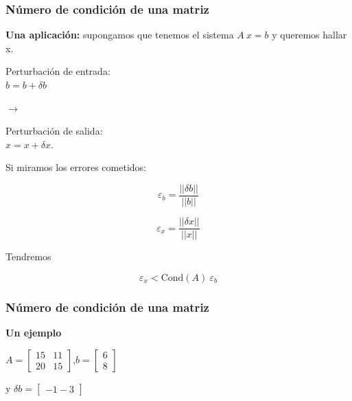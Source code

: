 \documentclass[xcolor=svgnames]{beamer} %
\theoremstyle{plain}
\renewcommand{\textbf}[1]{{\bfseries\textcolor{redUnq2}{#1}}}
\theoremstyle{definition}
\begin{document}
\begin{frame}
\frametitle{Número de condición de una matriz}\vspace{-15pt}
\textbf{Una aplicación:} supongamos que tenemos el sistema $ A\ x = b$ y queremos hallar x. \vspace{15pt}

\begin{minipage}{.4\linewidth}
Perturbación de entrada:\\
 $\hat b = b+\delta b$
\end{minipage}  \hspace{10pt}$\rightarrow$\hspace{10pt}\begin{minipage}{.4\linewidth}
Perturbación de salida: \\$\hat x = x+\delta x$. 
\end{minipage}\vspace{10pt}

Si miramos los errores cometidos:\vspace{10pt}

\begin{minipage}{.45\linewidth}
$$\varepsilon_b = \frac{ ||\delta b||}{||b||}$$
\end{minipage}\begin{minipage}{.45\linewidth}
$$\varepsilon_x = \frac{ ||\delta x||}{||x||}$$
\end{minipage}
Tendremos\vspace{10pt}
\begin{tcolorbox}
$$\varepsilon_x < \text{Cond}(A) \ \varepsilon_b$$
\end{tcolorbox}
\end{frame}

\begin{frame}
\frametitle{Número de condición de una matriz}
\textbf{Un ejemplo}\vspace{15pt}

\begin{huge}
$A=\begin{bmatrix} 
15 & 11 \\
20 & 15
\end{bmatrix}$,\hspace{30pt}$b=\begin{bmatrix} 
6 \\
8
\end{bmatrix}$ \vspace{15pt}

y \hspace{30pt} $\delta b=\begin{bmatrix} 
-1
-3
\end{bmatrix}$

\end{huge}

\end{frame}
\end{document}
